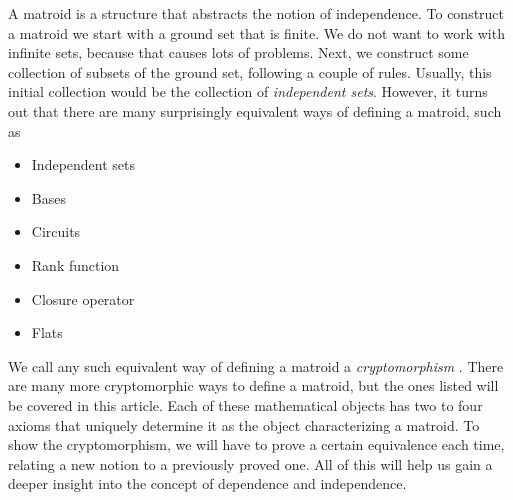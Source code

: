 A matroid is a structure that abstracts the notion of independence. To construct a matroid we start with a ground set that is finite. We do not want to work with infinite sets, because that causes lots of problems. Next, we construct some collection of subsets of the ground set, following a couple of rules. Usually, this initial collection would be the collection of \textit{independent sets}. However, it turns out that there are many surprisingly equivalent ways of defining a matroid, such as
\begin{itemize}
    \item Independent sets
    \item Bases
    \item Circuits
    \item Rank function
    \item Closure operator
    \item Flats
\end{itemize}

We call any such equivalent way of defining a matroid a \textit{cryptomorphism} \cite{gordon_mcnulty_2012}.
There are many more cryptomorphic ways to define a matroid, but the ones listed will be covered in this article. Each of these mathematical objects has two to four axioms that uniquely determine it as the object characterizing a matroid. To show the cryptomorphism, we will have to prove a certain equivalence each time, relating a new notion to a previously proved one. All of this will help us gain a deeper insight into the concept of dependence and independence.
